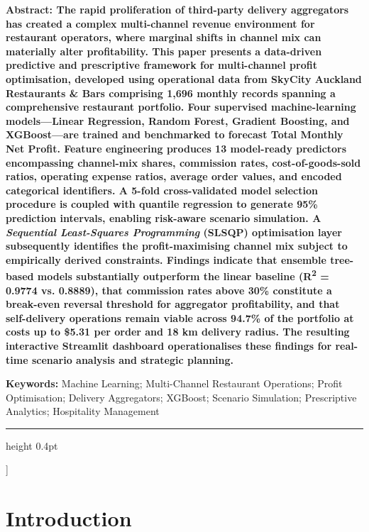 \documentclass[10pt,a4paper,twocolumn]{article}
\renewenvironment{abstract}
  {\small\bfseries Abstract:\normalfont\enspace}
  {\par}
\begin{document}
{\begin{@twocolumnfalse}
  \begin{abstract}
  The rapid proliferation of third-party delivery aggregators has created a complex
  multi-channel revenue environment for restaurant operators, where marginal shifts in
  channel mix can materially alter profitability. This paper presents a data-driven
  predictive and prescriptive framework for multi-channel profit optimisation, developed
  using operational data from SkyCity Auckland Restaurants \& Bars comprising 1{,}696
  monthly records spanning a comprehensive restaurant portfolio. Four supervised
  machine-learning models---Linear Regression, Random Forest, Gradient Boosting, and
  XGBoost---are trained and benchmarked to forecast Total Monthly Net Profit. Feature
  engineering produces 13 model-ready predictors encompassing channel-mix shares,
  commission rates, cost-of-goods-sold ratios, operating expense ratios, average order
  values, and encoded categorical identifiers. A 5-fold cross-validated model selection
  procedure is coupled with quantile regression to generate 95\% prediction intervals,
  enabling risk-aware scenario simulation. A \textit{Sequential Least-Squares Programming}
  (SLSQP) optimisation layer subsequently identifies the profit-maximising channel mix
  subject to empirically derived constraints. Findings indicate that ensemble tree-based
  models substantially outperform the linear baseline (R\textsuperscript{2} = 0.9774 vs.
  0.8889), that commission rates above 30\% constitute a break-even reversal threshold for
  aggregator profitability, and that self-delivery operations remain viable across 94.7\%
  of the portfolio at costs up to \$5.31 per order and 18 km delivery radius. The resulting
  interactive Streamlit dashboard operationalises these findings for real-time scenario
  analysis and strategic planning.
  \end{abstract}
  \vspace{6pt}

  \noindent\textbf{Keywords:} Machine Learning; Multi-Channel Restaurant Operations;
  Profit Optimisation; Delivery Aggregators; XGBoost; Scenario Simulation;
  Prescriptive Analytics; Hospitality Management
  \vspace{10pt}
  \hrule height 0.4pt
  \vspace{12pt}

\end{@twocolumnfalse}
}]

\section{Introduction}
\label{sec:introduction}
\end{document}
